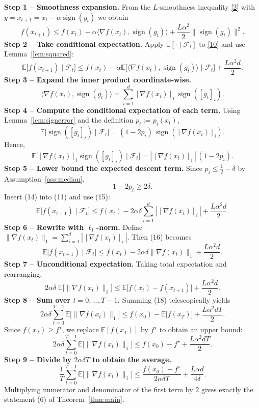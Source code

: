 \documentclass[11pt]{article}
\newcommand{\sign}{\operatorname{sign}}
\newcommand{\EE}{\mathbb{E}}
\begin{document}
\noindent\textbf{Step 1 – Smoothness expansion.}  
From the $L$‑smoothness inequality \eqref{2} with $y=x_{t+1}=x_t-\alpha\sign(g_t)$ we obtain
\[
f(x_{t+1})\le f(x_t)-\alpha\langle\nabla f(x_t),\sign(g_t)\rangle
+\frac{L\alpha^{2}}{2}\|\sign(g_t)\|^{2}.
\tag{10}
\]
\noindent\textbf{Step 2 – Take conditional expectation.}  
Apply $\EE[\cdot\mid\mathcal{F}_t]$ to \eqref{10} and use Lemma~\ref{lem:squared}:
\[
\EE\!\bigl[f(x_{t+1})\mid\mathcal{F}_t\bigr]
\le f(x_t)-\alpha\EE\!\bigl[\langle\nabla f(x_t),\sign(g_t)\rangle\mid\mathcal{F}_t\bigr]
+\frac{L\alpha^{2}d}{2}.
\tag{11}
\]
\noindent\textbf{Step 3 – Expand the inner product coordinate‑wise.}  
\[
\langle\nabla f(x_t),\sign(g_t)\rangle
=\sum_{i=1}^{d}[\nabla f(x_t)]_i\,\sign([g_t]_i).
\tag{12}
\]
\noindent\textbf{Step 4 – Compute the conditional expectation of each term.}  
Using Lemma~\ref{lem:signerror} and the definition $p_i:=p_i(x_t)$,
\[
\EE\!\bigl[\sign([g_t]_i)\mid\mathcal{F}_t\bigr]
=(1-2p_i)\,\sign([\nabla f(x_t)]_i).
\tag{13}
\]
Hence,
\[
\EE\!\bigl[[\nabla f(x_t)]_i\sign([g_t]_i)\mid\mathcal{F}_t\bigr]
=|\,[\nabla f(x_t)]_i\,|\,(1-2p_i).
\tag{14}
\]
\noindent\textbf{Step 5 – Lower bound the expected descent term.}  
Since $p_i\le\frac12-\delta$ by Assumption~\ref{ass:median},
\[
1-2p_i\ge 2\delta.
\tag{15}
\]
Insert (14) into (11) and use (15):
\[
\EE\!\bigl[f(x_{t+1})\mid\mathcal{F}_t\bigr]
\le f(x_t)-2\alpha\delta\sum_{i=1}^{d}|\,[\nabla f(x_t)]_i\,|
+\frac{L\alpha^{2}d}{2}.
\tag{16}
\]
\noindent\textbf{Step 6 – Rewrite with $\ell_{1}$‑norm.}  
Define $\|\nabla f(x_t)\|_{1}=\sum_{i=1}^{d}|\,[\nabla f(x_t)]_i\,|$. Then (16) becomes
\[
\EE\!\bigl[f(x_{t+1})\mid\mathcal{F}_t\bigr]
\le f(x_t)-2\alpha\delta\|\nabla f(x_t)\|_{1}
+\frac{L\alpha^{2}d}{2}.
\tag{17}
\]
\noindent\textbf{Step 7 – Unconditional expectation.}  
Taking total expectation and rearranging,
\[
2\alpha\delta\;\EE\!\bigl[\|\nabla f(x_t)\|_{1}\bigr]
\le \EE\!\bigl[f(x_t)-f(x_{t+1})\bigr]
+\frac{L\alpha^{2}d}{2}.
\tag{18}
\]
\noindent\textbf{Step 8 – Sum over $t=0,\dots,T-1$.}  
Summing (18) telescopically yields
\[
2\alpha\delta\sum_{t=0}^{T-1}\EE\!\bigl[\|\nabla f(x_t)\|_{1}\bigr]
\le f(x_0)-\EE\!\bigl[f(x_T)\bigr]
+\frac{L\alpha^{2}dT}{2}.
\tag{19}
\]
Since $f(x_T)\ge f^{\star}$, we replace $\EE[f(x_T)]$ by $f^{\star}$ to obtain an upper bound:
\[
2\alpha\delta\sum_{t=0}^{T-1}\EE\!\bigl[\|\nabla f(x_t)\|_{1}\bigr]
\le f(x_0)-f^{\star}
+\frac{L\alpha^{2}dT}{2}.
\tag{20}
\]
\noindent\textbf{Step 9 – Divide by $2\alpha\delta T$ to obtain the average.}
\[
\frac{1}{T}\sum_{t=0}^{T-1}\EE\!\bigl[\|\nabla f(x_t)\|_{1}\bigr]
\le
\frac{f(x_0)-f^{\star}}{2\alpha\delta T}
+\frac{L\alpha d}{4\delta}.
\tag{21}
\]
Multiplying numerator and denominator of the first term by $2$ gives exactly the statement (6) of Theorem~\ref{thm:main}.
\end{document}

